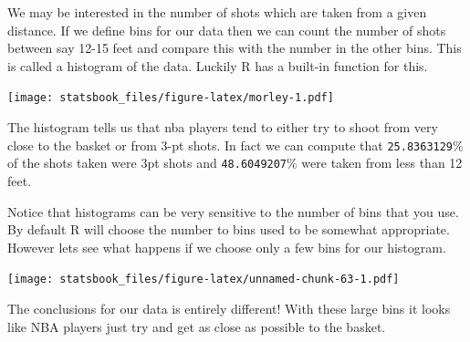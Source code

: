 \documentclass[
]{book}
\newenvironment{Shaded}{\begin{snugshade}}{\end{snugshade}}
\newcommand{\AttributeTok}[1]{\textcolor[rgb]{0.77,0.63,0.00}{#1}}
\newcommand{\ConstantTok}[1]{\textcolor[rgb]{0.00,0.00,0.00}{#1}}
\newcommand{\DecValTok}[1]{\textcolor[rgb]{0.00,0.00,0.81}{#1}}
\newcommand{\FunctionTok}[1]{\textcolor[rgb]{0.00,0.00,0.00}{#1}}
\newcommand{\NormalTok}[1]{#1}
\newcommand{\SpecialCharTok}[1]{\textcolor[rgb]{0.00,0.00,0.00}{#1}}
\newcommand{\StringTok}[1]{\textcolor[rgb]{0.31,0.60,0.02}{#1}}
\theoremstyle{definition}
\theoremstyle{definition}
\theoremstyle{definition}
\theoremstyle{definition}
\theoremstyle{remark}
\begin{document}
We may be interested in the number of shots which are taken from a given distance. If we define bins for our data then we can count the number of shots between say 12-15 feet and compare this with the number in the other bins. This is called a histogram of the data. Luckily R has a built-in function for this.

\begin{Shaded}
\end{Shaded}

\texttt{[image: statsbook\_files/figure-latex/morley-1.pdf]}

The histogram tells us that nba players tend to either try to shoot from very close to the basket or from 3-pt shots. In fact we can compute that \texttt{25.8363129}\% of the shots taken were 3pt shots and \texttt{48.6049207}\% were taken from less than 12 feet.

Notice that histograms can be very sensitive to the number of bins that you use. By default R will choose the number to bins used to be somewhat appropriate. However lets see what happens if we choose only a few bins for our histogram.

\begin{Shaded}
\end{Shaded}

\texttt{[image: statsbook\_files/figure-latex/unnamed-chunk-63-1.pdf]}

The conclusions for our data is entirely different! With these large bins it looks like NBA players just try and get as close as possible to the basket.
\end{document}
